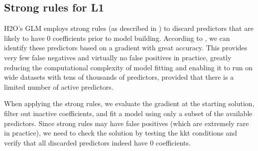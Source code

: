 \subsection{Strong rules for L1} \label{strongrules}

H2O's GLM employs strong rules (as described in ) to discard predictors that are likely to have
0 coefficients prior to model building. According to , we can identify these predictors based on
a gradient with great accuracy. This provides very few false negatives and virtually no false positives in
practice, greatly reducing the computational complexity of model fitting and enabling it to run on wide datasets
with tens of thousands of predictors, provided that there is a limited number of active predictors.

When applying the strong rules, we evaluate the gradient at the starting solution, filter out inactive
coefficients, and fit a model using only a subset of the available predictors. Since strong rules may have false
positives (which are extremely rare in practice), we need to check the solution by testing the kkt conditions and
verify that all discarded predictors indeed have 0 coefficients.





